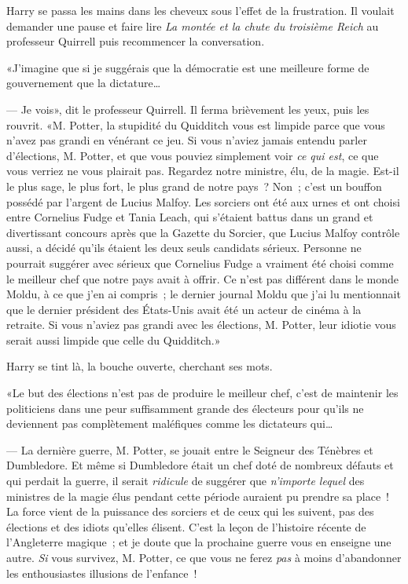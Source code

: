 Harry se passa les mains dans les cheveux sous l'effet de la frustration. Il voulait demander une pause et faire lire \emph{La montée et la chute du troisième Reich} au professeur Quirrell puis recommencer la conversation.

«J'imagine que si je suggérais que la démocratie est une meilleure forme de gouvernement que la dictature…

--- Je vois», dit le professeur Quirrell. Il ferma brièvement les yeux, puis les rouvrit. «M. Potter, la stupidité du Quidditch vous est limpide parce que vous n'avez pas grandi en vénérant ce jeu. Si vous n'aviez jamais entendu parler d'élections, M. Potter, et que vous pouviez simplement voir \emph{ce qui est}, ce que vous verriez ne vous plairait pas. Regardez notre ministre, élu, de la magie. Est-il le plus sage, le plus fort, le plus grand de notre pays~? Non~; c'est un bouffon possédé par l'argent de Lucius Malfoy. Les sorciers ont été aux urnes et ont choisi entre Cornelius Fudge et Tania Leach, qui s'étaient battus dans un grand et divertissant concours après que la Gazette du Sorcier, que Lucius Malfoy contrôle aussi, a décidé qu'ils étaient les deux seuls candidats sérieux. Personne ne pourrait suggérer avec sérieux que Cornelius Fudge a vraiment été choisi comme le meilleur chef que notre pays avait à offrir. Ce n'est pas différent dans le monde Moldu, à ce que j'en ai compris~; le dernier journal Moldu que j'ai lu mentionnait que le dernier président des États-Unis avait été un acteur de cinéma à la retraite. Si vous n'aviez pas grandi avec les élections, M. Potter, leur idiotie vous serait aussi limpide que celle du Quidditch.»

Harry se tint là, la bouche ouverte, cherchant ses mots.

«Le but des élections n'est pas de produire le meilleur chef, c'est de maintenir les politiciens dans une peur suffisamment grande des électeurs pour qu'ils ne deviennent pas complètement maléfiques comme les dictateurs qui…

--- La dernière guerre, M. Potter, se jouait entre le Seigneur des Ténèbres et Dumbledore. Et même si Dumbledore était un chef doté de nombreux défauts et qui perdait la guerre, il serait \emph{ridicule} de suggérer que \emph{n'importe lequel} des ministres de la magie élus pendant cette période auraient pu prendre sa place~! La force vient de la puissance des sorciers et de ceux qui les suivent, pas des élections et des idiots qu'elles élisent. C'est la leçon de l'histoire récente de l'Angleterre magique~; et je doute que la prochaine guerre vous en enseigne une autre. \emph{Si} vous survivez, M. Potter, ce que vous ne ferez \emph{pas} à moins d'abandonner les enthousiastes illusions de l'enfance~!

